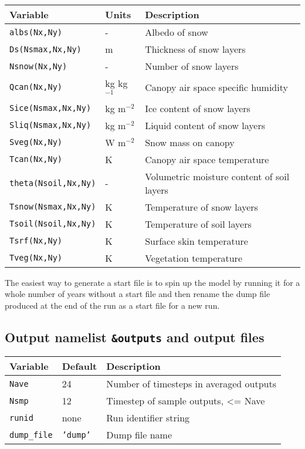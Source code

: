 \documentclass{article}
\begin{document}
\begin{tabular}{|l|l|l|}
\hline
Variable    & Units        & Description                                \\
\hline
{\tt albs(Nx,Ny)}        & -            & Albedo of snow                             \\
{\tt Ds(Nsmax,Nx,Ny)}    & m            & Thickness of snow layers                   \\
{\tt Nsnow(Nx,Ny)}       & -            & Number of snow layers                      \\
{\tt Qcan(Nx,Ny)}        & kg kg$^{-1}$ & Canopy air space specific humidity         \\
{\tt Sice(Nsmax,Nx,Ny)}  & kg m$^{-2}$  & Ice content of snow layers                 \\
{\tt Sliq(Nsmax,Nx,Ny)}  & kg m$^{-2}$  & Liquid content of snow layers              \\
{\tt Sveg(Nx,Ny)}        & W m$^{-2}$   & Snow mass on canopy                        \\
{\tt Tcan(Nx,Ny)}        & K            & Canopy air space temperature               \\
{\tt theta(Nsoil,Nx,Ny)} & -            & Volumetric moisture content of soil layers \\
{\tt Tsnow(Nsmax,Nx,Ny)} & K            & Temperature of snow layers                 \\
{\tt Tsoil(Nsoil,Nx,Ny)} & K            & Temperature of soil layers                 \\
{\tt Tsrf(Nx,Ny)}        & K            & Surface skin temperature                   \\
{\tt Tveg(Nx,Ny)}        & K            & Vegetation temperature                     \\
\hline 
\end{tabular}

The easiest way to generate a start file is to spin up the model by running it for a whole number of years without a start file and then rename the dump file produced at the end of the run as a start file for a new run.

\subsection*{Output namelist {\tt \&outputs} and output files}

\begin{tabular}{|l|l|l|}
\hline
Variable         & Default      & Description                             \\
\hline
{\tt Nave}       & 24           & Number of timesteps in averaged outputs \\
{\tt Nsmp}       & 12           & Timestep of sample outputs, <= Nave     \\
{\tt runid}      & none         & Run identifier string                   \\
{\tt dump\_file} & {\tt 'dump'} & Dump file name                          \\
\hline 
\end{tabular}
\end{document}
